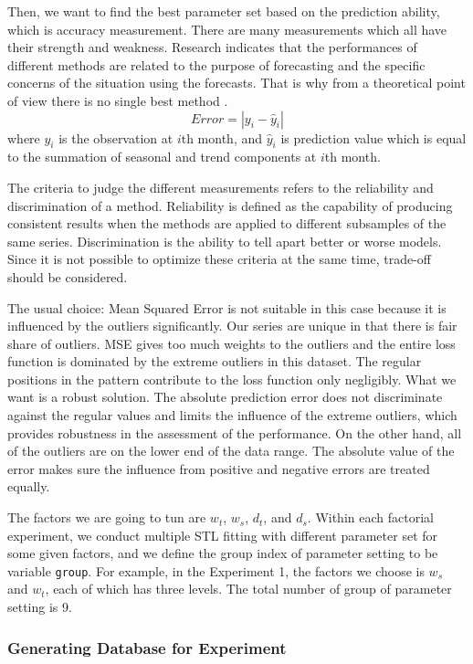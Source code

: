 Then, we want to find the best parameter set based on the prediction ability,
which is accuracy measurement. 
There are many measurements which all have their strength and weakness. 
Research indicates that the performances of different methods are related to the
purpose of forecasting and the specific concerns of the situation using the 
forecasts. 
That is why from a theoretical point of view there is no single best method 
\cite{brockwell2002introduction}.
$$
Error = | y_i - \hat y_i |
$$
where $y_i$ is the observation at $i$th month, and $\hat y_i$ is prediction value
which is equal to the summation of seasonal and trend components at $i$th month.

The criteria to judge the different measurements refers to the reliability and
discrimination of a method. Reliability is defined as the capability of producing 
consistent results when the methods are applied to different subsamples of the 
same series. Discrimination is the ability to tell apart better or worse models. 
Since it is not possible to optimize these criteria at the same time, trade-off 
should be considered.

The usual choice: 
Mean Squared Error is not suitable in this case because it is influenced by the 
outliers significantly. Our series are unique in that there is fair share of 
outliers. MSE gives too much weights to the outliers and the entire loss function is
dominated by the extreme outliers in this dataset. The regular positions in the 
pattern contribute to the loss function only negligibly. What we want is a robust
solution. The absolute prediction error does not discriminate against the regular
values and limits the influence of the extreme outliers, which provides robustness 
in the assessment of the performance. On the other hand, all of the outliers are 
on the lower end of the data range. The absolute value of the error makes sure 
the influence from positive and negative errors are treated equally.

The factors we are going to tun are $w_t$, $w_s$, $d_t$, 
and $d_s$. Within each factorial experiment, we conduct multiple STL fitting with 
different parameter set for some given factors, and we define the group index of 
parameter setting to be variable \texttt{group}. For example, in the Experiment 1,
the factors we choose is $w_s$ and $w_t$, each of which has three levels. The 
total number of group of parameter setting is 9.

\subsubsection{Generating Database for Experiment}

